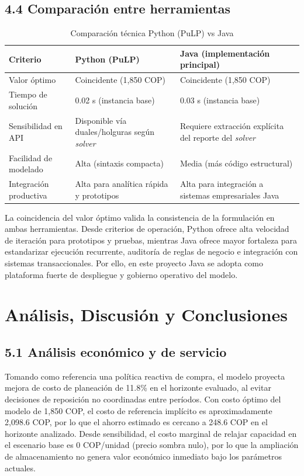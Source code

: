 \documentclass[12pt,letterpaper]{article}
\begin{document}
\subsection{4.4 Comparación entre herramientas}

\begin{table}[H]
\centering
\caption{Comparación técnica Python (PuLP) vs Java}
\begin{tabular}{|p{3.4cm}|p{3.6cm}|p{3.8cm}|}
\hline
\textbf{Criterio} & \textbf{Python (PuLP)} & \textbf{Java (implementación principal)} \\
\hline
Valor óptimo & Coincidente (1,850 COP) & Coincidente (1,850 COP) \\
\hline
Tiempo de solución & 0.02 s (instancia base) & 0.03 s (instancia base) \\
\hline
Sensibilidad en API & Disponible vía duales/holguras según \textit{solver} & Requiere extracción explícita del reporte del \textit{solver} \\
\hline
Facilidad de modelado & Alta (sintaxis compacta) & Media (más código estructural) \\
\hline
Integración productiva & Alta para analítica rápida y prototipos & Alta para integración a sistemas empresariales Java \\
\hline
\end{tabular}
\end{table}

La coincidencia del valor óptimo valida la consistencia de la formulación en ambas herramientas. Desde criterios de operación, Python ofrece alta velocidad de iteración para prototipos y pruebas, mientras Java ofrece mayor fortaleza para estandarizar ejecución recurrente, auditoría de reglas de negocio e integración con sistemas transaccionales. Por ello, en este proyecto Java se adopta como plataforma fuerte de despliegue y gobierno operativo del modelo.

\section{Análisis, Discusión y Conclusiones}
\subsection{5.1 Análisis económico y de servicio}
Tomando como referencia una política reactiva de compra, el modelo proyecta mejora de costo de planeación de 11.8\% en el horizonte evaluado, al evitar decisiones de reposición no coordinadas entre períodos. Con costo óptimo del modelo de 1,850 COP, el costo de referencia implícito es aproximadamente 2,098.6 COP, por lo que el ahorro estimado es cercano a 248.6 COP en el horizonte analizado. Desde sensibilidad, el costo marginal de relajar capacidad en el escenario base es 0 COP/unidad (precio sombra nulo), por lo que la ampliación de almacenamiento no genera valor económico inmediato bajo los parámetros actuales.
\end{document}
